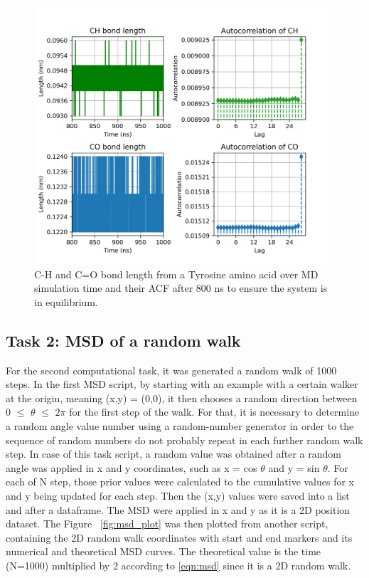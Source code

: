 \documentclass{article}
\begin{document}
\begin{figure}[H]
\includegraphics[width=\linewidth]{CO_CH_length_acf_plot.png}
\caption{C-H and C=O bond length from a Tyrosine amino acid over MD simulation time and their ACF after 800 ns to ensure the system is in equilibrium.}
\label{fig:acf_plot}
\end{figure}

\subsection{Task 2: MSD of a random walk}

For the second computational task, it was generated a random walk of 1000 steps. In the first MSD script, by starting with an example with a certain walker at the origin, meaning (x,y) = (0,0), it then chooses a random direction between 0 $\leq$ $\theta$ $\leq$ $2\pi$ for the first step of the walk. For that, it is necessary to determine a random angle value number using a random-number generator in order to the sequence of random numbers do not probably repeat in each further random walk step. In case of this task script, a random value was obtained after a random angle was applied in x and y coordinates, such as x = cos $\theta$ and y = sin $\theta$. For each of N step, those prior values were calculated to the cumulative values for x and y being updated for each step. Then the (x,y) values were saved into a list and after a dataframe. The MSD were applied in x and y as it is a 2D position dataset. The Figure ~\ref{fig:msd_plot} was then plotted from another script, containing the 2D random walk coordinates with start and end markers and its numerical and theoretical MSD curves. The theoretical value is the time (N=1000) multiplied by 2 according to \ref{eqn:msd} since it is a 2D random walk.
\end{document}
